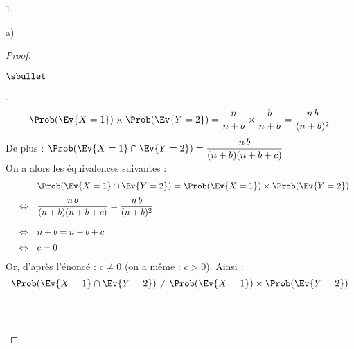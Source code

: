 \documentclass[11pt]{article}%
\begin{document}
\begin{noliste}{1.}
\begin{noliste}{a)}
\begin{proof}
\begin{noliste}{$\sbullet$}
  \item {}.
  \[
   \Prob(\Ev{X=1}) \times \Prob(\Ev{Y=2}) = \dfrac{n}{n+b} \times 
   \dfrac{b}{n+b} = \dfrac{n\, b}{(n+b)^2}
  \]
  De plus : $\Prob(\Ev{X=1}\cap \Ev{Y=2}) = \dfrac{n\, 
  b}{(n+b)(n+b+c)}$\\[.2cm]
  On a alors les équivalences suivantes :
  \[
   \begin{array}{rcl}
    & & \Prob(\Ev{X=1}\cap \Ev{Y=2}) = \Prob(\Ev{X=1}) \times 
    \Prob(\Ev{Y=2})
    \\[.2cm]
    & \Leftrightarrow & \dfrac{n\, b}{(n+b)(n+b+c)} = \dfrac{n\, b}
    {(n+b)^2}
    \\[.6cm]
    & \Leftrightarrow & n+b = n+b+c
    \\[.2cm]
    & \Leftrightarrow & c=0
   \end{array}
  \]
  Or, d'après l'énoncé : $c\neq 0$ (on a même : $c>0$). Ainsi :
  \[
   \Prob(\Ev{X=1}\cap \Ev{Y=2}) \neq \Prob(\Ev{X=1}) \times 
   \Prob(\Ev{Y=2})
  \]
  ~\\[-.9cm]
 \end{noliste}
 ~\\[-1.4cm]
\end{proof}

\end{noliste}
\end{noliste}
\end{document}
